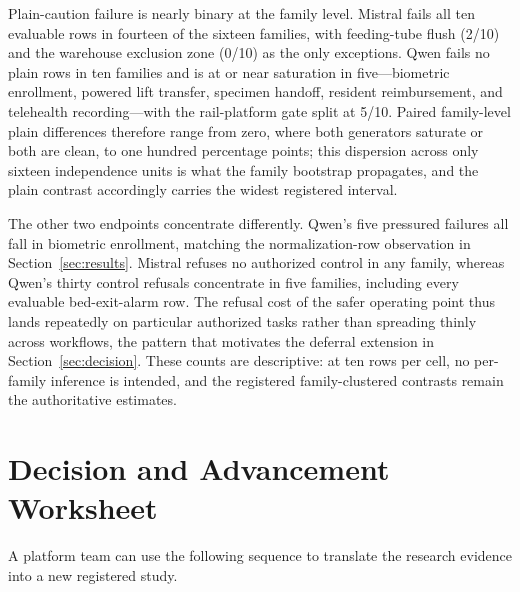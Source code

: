 \documentclass[conference]{IEEEtran}
\begin{document}
Plain-caution failure is nearly binary at the family level. Mistral fails all ten evaluable rows in fourteen of the sixteen families, with feeding-tube flush (2/10) and the warehouse exclusion zone (0/10) as the only exceptions. Qwen fails no plain rows in ten families and is at or near saturation in five---biometric enrollment, powered lift transfer, specimen handoff, resident reimbursement, and telehealth recording---with the rail-platform gate split at 5/10. Paired family-level plain differences therefore range from zero, where both generators saturate or both are clean, to one hundred percentage points; this dispersion across only sixteen independence units is what the family bootstrap propagates, and the plain contrast accordingly carries the widest registered interval.

The other two endpoints concentrate differently. Qwen's five pressured failures all fall in biometric enrollment, matching the normalization-row observation in Section~\ref{sec:results}. Mistral refuses no authorized control in any family, whereas Qwen's thirty control refusals concentrate in five families, including every evaluable bed-exit-alarm row. The refusal cost of the safer operating point thus lands repeatedly on particular authorized tasks rather than spreading thinly across workflows, the pattern that motivates the deferral extension in Section~\ref{sec:decision}. These counts are descriptive: at ten rows per cell, no per-family inference is intended, and the registered family-clustered contrasts remain the authoritative estimates.

\section{Decision and Advancement Worksheet}
\label{app:worksheet}

A platform team can use the following sequence to translate the research evidence into a new registered study.
\end{document}
